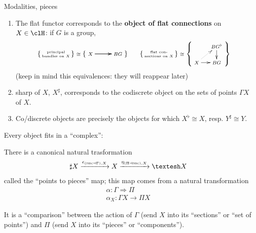 \documentclass[presentation,handout]{beamer}
\begin{document}
%
%
%
%
%
%
%
\begin{frame}{Modalities, pieces}
  \begin{enumerate}
    \item<+-> The \alert{flat} functor corresponds to the \textbf{object of flat connections} on $X\in \clH$: if $G$ is a group,
    \[\scriptsize
    \left\{
    \begin{smallmatrix}
      \text{principal}\\
      \text{bundles on $X$}
    \end{smallmatrix}
    \right\} \cong 
    \left\{ 
      \vcenter{\xymatrix{X \ar[r]\ar[r]& BG}}
    \right\}\qquad
    \left\{
    \begin{smallmatrix}
      \text{flat con-}\\
      \text{nections on $X$}
    \end{smallmatrix}
    \right\}
    \cong\left\{
    \vcenter{\xymatrix@R=4mm@C=4mm{
    & BG^{\flat} \ar[d]\\
    X \ar[r]\ar@{.>}[ur]& BG
    }}\right\}
    \]
    (keep in mind this equivalences: they will reappear later)
    \item<+-> \alert{sharp} of $X$, $X^{\sharp}$, corresponds to the codiscrete object on the sets of \alert{points} $\Gamma X$ of $X$.
    \item<+-> Co/discrete objects are precisely the objects for which $X^{\flat} \cong X$, resp. $Y^{\sharp} \cong Y$.
  \end{enumerate}
\end{frame}
%
%
%
%
%
%
%
\begin{frame}
  Every object fits in a ``complex'':
  \onslide<+->
  \begin{df}
    There is a canonical natural trasformation
    \[
    \sharp X \xto{\epsilon_{(\disc\dashv\Gamma),X}} X \xto{\eta_{(\Pi\dashv\disc),X}} \shape X
    \]
    called the ``\alert{points to pieces}'' map; \onslide<+-> this map comes from a natural transformation
    \begin{gather*}
      \alpha : \Gamma \Rightarrow \Pi \\ \alpha_X : \Gamma X \to \Pi X
    \end{gather*}
  \end{df}
  \onslide<+->
  It is a ``comparison'' between the action of $\Gamma$ (send $X$ into its ``sections'' or ``set of points'') and $\Pi$ (send $X$ into its ``pieces'' or ``components'').
\end{frame}
%
%
%
%
%
%
%
\end{document}
